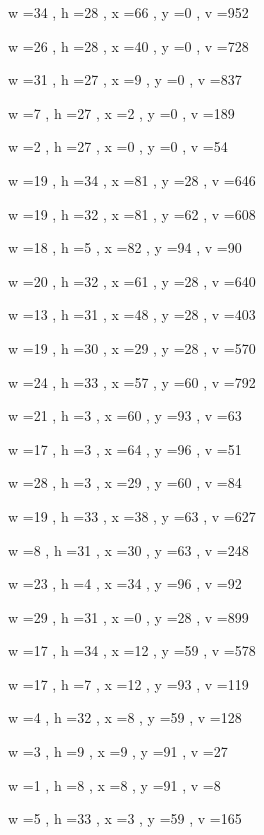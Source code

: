 \documentclass[11pt]{article}
\begin{document}
w =34 , h =28 , x =66 , y =0 , v =952
\par
w =26 , h =28 , x =40 , y =0 , v =728
\par
w =31 , h =27 , x =9 , y =0 , v =837
\par
w =7 , h =27 , x =2 , y =0 , v =189
\par
w =2 , h =27 , x =0 , y =0 , v =54
\par
w =19 , h =34 , x =81 , y =28 , v =646
\par
w =19 , h =32 , x =81 , y =62 , v =608
\par
w =18 , h =5 , x =82 , y =94 , v =90
\par
w =20 , h =32 , x =61 , y =28 , v =640
\par
w =13 , h =31 , x =48 , y =28 , v =403
\par
w =19 , h =30 , x =29 , y =28 , v =570
\par
w =24 , h =33 , x =57 , y =60 , v =792
\par
w =21 , h =3 , x =60 , y =93 , v =63
\par
w =17 , h =3 , x =64 , y =96 , v =51
\par
w =28 , h =3 , x =29 , y =60 , v =84
\par
w =19 , h =33 , x =38 , y =63 , v =627
\par
w =8 , h =31 , x =30 , y =63 , v =248
\par
w =23 , h =4 , x =34 , y =96 , v =92
\par
w =29 , h =31 , x =0 , y =28 , v =899
\par
w =17 , h =34 , x =12 , y =59 , v =578
\par
w =17 , h =7 , x =12 , y =93 , v =119
\par
w =4 , h =32 , x =8 , y =59 , v =128
\par
w =3 , h =9 , x =9 , y =91 , v =27
\par
w =1 , h =8 , x =8 , y =91 , v =8
\par
w =5 , h =33 , x =3 , y =59 , v =165
\par
\newpage
\end{document}
